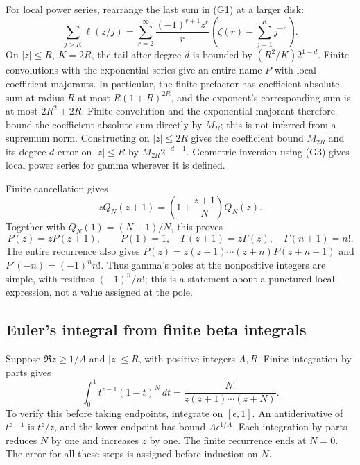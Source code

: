 For local power series, rearrange the last sum in (G1) at a larger disk:
\[
 \sum_{j>K}\ell(z/j)
 =\sum_{r=2}^{\infty}\frac{(-1)^{r+1}z^r}{r}
                 \left(\zeta(r)-\sum_{j=1}^Kj^{-r}\right).
\]
On $|z|\le R$, $K=2R$, the tail after degree $d$ is bounded by
$(R^2/K)2^{1-d}$. Finite convolutions with the exponential series give
an entire name $P$ with local coefficient majorants. In particular,
the finite prefactor has coefficient absolute sum at radius $R$ at
most $R(1+R)^{2R}$, and the exponent's corresponding sum is at most
$2R^2+2R$. Finite convolution and the exponential majorant therefore
bound the coefficient absolute sum directly by $M_R$; this is not
inferred from a supremum norm. Constructing on $|z|\le2R$ gives the
coefficient bound $M_{2R}$ and its degree-$d$ error on $|z|\le R$ by
$M_{2R}2^{-d-1}$. Geometric inversion using (G3) gives local power
series for gamma wherever it is defined.

Finite cancellation gives
\[
 zQ_N(z+1)=\left(1+\frac{z+1}{N}\right)Q_N(z).
\]
Together with $Q_N(1)=(N+1)/N$, this proves
\[
 P(z)=zP(z+1),\qquad P(1)=1,
 \quad\Gamma(z+1)=z\Gamma(z),\quad\Gamma(n+1)=n!.
 \tag{G4}\label{eq:gamma-recurrence}
\]
The entire recurrence also gives
$P(z)=z(z+1)\cdots(z+n)P(z+n+1)$ and
$P'(-n)=(-1)^n n!$. Thus gamma's poles at the nonpositive integers are
simple, with residues $(-1)^n/n!$; this is a statement about a punctured
local expression, not a value assigned at the pole.

\subsection{Euler's integral from finite beta integrals}
Suppose $\Re z\ge1/A$ and $|z|\le R$, with positive integers $A,R$.
Finite integration by parts gives
\[
 \int_0^1t^{z-1}(1-t)^N\,dt
       =\frac{N!}{z(z+1)\cdots(z+N)}.
 \tag{G5}\label{eq:finite-beta}
\]
To verify this before taking endpoints, integrate on $[\epsilon,1]$.
An antiderivative of $t^{z-1}$ is $t^z/z$, and the lower endpoint has
bound $A\epsilon^{1/A}$. Each integration by parts reduces $N$ by one
and increases $z$ by one. The finite recurrence ends at $N=0$.
The error for all these steps is assigned before induction on $N$.

